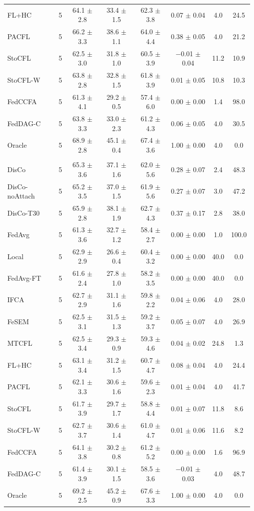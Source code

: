 {{\begin{tabular}{l r c c c c c c}
FL+HC & 5 & 64.1 $\pm$ 2.8 & 33.4 $\pm$ 1.5 & 62.3 $\pm$ 3.8 & 0.07 $\pm$ 0.04 & 4.0 & 24.5 \\
PACFL & 5 & 66.2 $\pm$ 3.3 & 38.6 $\pm$ 1.1 & 64.0 $\pm$ 4.4 & 0.38 $\pm$ 0.05 & 4.0 & 21.2 \\
StoCFL & 5 & 62.5 $\pm$ 3.0 & 31.8 $\pm$ 1.0 & 60.5 $\pm$ 3.9 & $-$0.01 $\pm$ 0.04 & 11.2 & 10.9 \\
StoCFL-W & 5 & 63.8 $\pm$ 2.8 & 32.8 $\pm$ 1.5 & 61.8 $\pm$ 3.9 & 0.01 $\pm$ 0.05 & 10.8 & 10.3 \\
FedCCFA & 5 & 61.3 $\pm$ 4.1 & 29.2 $\pm$ 0.5 & 57.4 $\pm$ 6.0 & 0.00 $\pm$ 0.00 & 1.4 & 98.0 \\
FedDAG-C & 5 & 63.8 $\pm$ 3.3 & 33.0 $\pm$ 2.3 & 61.2 $\pm$ 4.3 & 0.06 $\pm$ 0.05 & 4.0 & 30.5 \\
Oracle & 5 & 68.9 $\pm$ 2.8 & 45.1 $\pm$ 0.4 & 67.4 $\pm$ 3.6 & 1.00 $\pm$ 0.00 & 4.0 & 0.0 \\
\addlinespace
\multicolumn{8}{l}{\textit{CIFAR-10 label swap}} \\
DisCo & 5 & 65.3 $\pm$ 3.6 & 37.1 $\pm$ 1.6 & 62.0 $\pm$ 5.6 & 0.28 $\pm$ 0.07 & 2.4 & 48.3 \\
DisCo-noAttach & 5 & 65.2 $\pm$ 3.5 & 37.0 $\pm$ 1.5 & 61.9 $\pm$ 5.6 & 0.27 $\pm$ 0.07 & 3.0 & 47.2 \\
DisCo-T30 & 5 & 65.9 $\pm$ 2.8 & 38.1 $\pm$ 1.9 & 62.7 $\pm$ 4.3 & 0.37 $\pm$ 0.17 & 2.8 & 38.0 \\
FedAvg & 5 & 61.3 $\pm$ 3.6 & 32.7 $\pm$ 1.2 & 58.4 $\pm$ 2.7 & 0.00 $\pm$ 0.00 & 1.0 & 100.0 \\
Local & 5 & 62.9 $\pm$ 2.9 & 26.6 $\pm$ 0.4 & 60.4 $\pm$ 3.2 & 0.00 $\pm$ 0.00 & 40.0 & 0.0 \\
FedAvg-FT & 5 & 61.6 $\pm$ 2.4 & 27.8 $\pm$ 1.0 & 58.2 $\pm$ 3.5 & 0.00 $\pm$ 0.00 & 40.0 & 0.0 \\
IFCA & 5 & 62.7 $\pm$ 2.9 & 31.1 $\pm$ 1.6 & 59.8 $\pm$ 2.2 & 0.04 $\pm$ 0.06 & 4.0 & 28.0 \\
FeSEM & 5 & 62.5 $\pm$ 3.1 & 31.5 $\pm$ 1.3 & 59.2 $\pm$ 3.7 & 0.05 $\pm$ 0.07 & 4.0 & 26.9 \\
MTCFL & 5 & 62.5 $\pm$ 3.4 & 29.3 $\pm$ 0.9 & 59.3 $\pm$ 4.6 & 0.04 $\pm$ 0.02 & 24.8 & 1.3 \\
FL+HC & 5 & 63.1 $\pm$ 3.4 & 31.2 $\pm$ 1.5 & 60.7 $\pm$ 4.7 & 0.08 $\pm$ 0.04 & 4.0 & 24.4 \\
PACFL & 5 & 62.1 $\pm$ 3.3 & 30.6 $\pm$ 1.6 & 59.6 $\pm$ 2.3 & 0.01 $\pm$ 0.04 & 4.0 & 41.7 \\
StoCFL & 5 & 61.7 $\pm$ 3.9 & 29.7 $\pm$ 1.7 & 58.8 $\pm$ 4.4 & 0.01 $\pm$ 0.07 & 11.8 & 8.6 \\
StoCFL-W & 5 & 62.7 $\pm$ 3.7 & 30.6 $\pm$ 1.4 & 61.0 $\pm$ 4.7 & 0.01 $\pm$ 0.06 & 11.6 & 8.2 \\
FedCCFA & 5 & 64.1 $\pm$ 3.8 & 30.2 $\pm$ 0.8 & 61.2 $\pm$ 5.2 & 0.00 $\pm$ 0.00 & 1.6 & 96.9 \\
FedDAG-C & 5 & 61.4 $\pm$ 3.9 & 30.1 $\pm$ 1.5 & 58.5 $\pm$ 3.6 & $-$0.01 $\pm$ 0.03 & 4.0 & 48.7 \\
Oracle & 5 & 69.2 $\pm$ 2.5 & 45.2 $\pm$ 0.9 & 67.6 $\pm$ 3.3 & 1.00 $\pm$ 0.00 & 4.0 & 0.0 \\
\bottomrule
\end{tabular}}
}
